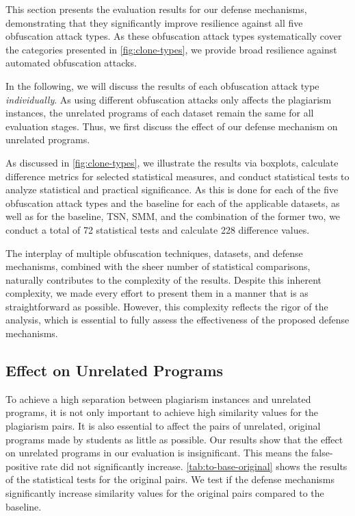This section presents the evaluation results for our defense mechanisms, demonstrating that they significantly improve resilience against all five obfuscation attack types. As these obfuscation attack types systematically cover the categories presented in \autoref{fig:clone-types}, we provide broad resilience against automated obfuscation attacks.

In the following, we will discuss the results of each obfuscation attack type \textit{individually}. As using different obfuscation attacks only affects the plagiarism instances, the unrelated programs of each dataset remain the same for all evaluation stages. Thus, we first discuss the effect of our defense mechanism on unrelated programs.

As discussed in \autoref{fig:clone-types}, we illustrate the results via boxplots, calculate difference metrics for selected statistical measures, and conduct statistical tests to analyze statistical and practical significance. As this is done for each of the five obfuscation attack types and the baseline for each of the applicable datasets, as well as for the baseline, TSN, SMM, and the combination of the former two, we conduct a total of 72 statistical tests and calculate 228 difference values.

The interplay of multiple obfuscation techniques, datasets, and defense mechanisms, combined with the sheer number of statistical comparisons, naturally contributes to the complexity of the results. Despite this inherent complexity, we made every effort to present them in a manner that is as straightforward as possible. 
However, this complexity reflects the rigor of the analysis, which is essential to fully assess the effectiveness of the proposed defense mechanisms.


 

\subsection{Effect on Unrelated Programs}\label{sec:eval-unrel}
To achieve a high separation between plagiarism instances and unrelated programs, it is not only important to achieve high similarity values for the plagiarism pairs.
It is also essential to affect the pairs of unrelated, original programs made by students as little as possible. 
Our results show that the effect on unrelated programs in our evaluation is insignificant. This means the false-positive rate did not significantly increase.
\autoref{tab:to-base-original} shows the results of the statistical tests for the original pairs. We test if the defense mechanisms significantly increase similarity values for the original pairs compared to the baseline.

